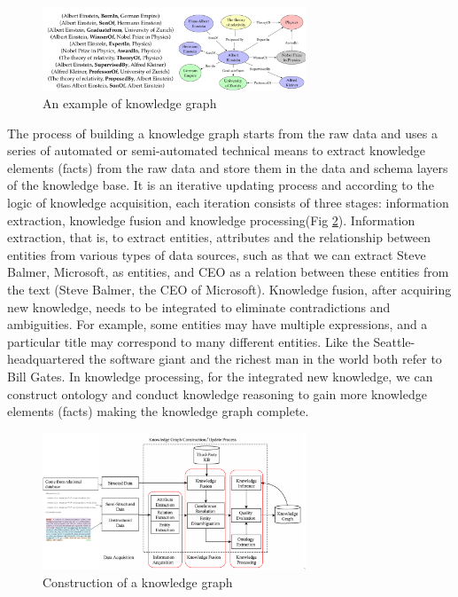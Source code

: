 \documentclass[%
 aip,
 jmp,%
 amsmath,amssymb,
 reprint,%
]{revtex4-2}
\begin{document}
\begin{figure}[htbp]
 \centering
 \includegraphics[width=0.7\textwidth]{figure/2.png}
 \caption{ An example of knowledge graph }
 \label{ Fig.2 }
\end{figure}

The process of building a knowledge graph starts from the raw data and uses a series of automated or 
semi-automated technical means to extract knowledge elements (facts) from the raw data and store them 
in the data and schema layers of the knowledge base\cite{gutierrez2021knowledge}. It is an iterative updating process and according 
to the logic of knowledge acquisition, each iteration consists of three stages: information extraction, 
knowledge fusion and knowledge processing(Fig \ref{ Fig.1 }). Information extraction, that is, to extract 
entities, attributes and the relationship between entities from various types of data sources, 
such as that we can extract Steve Balmer, Microsoft, as entities, and CEO as a relation between these entities from
the text (Steve Balmer, the CEO of Microsoft). Knowledge fusion, after acquiring new knowledge, needs to be 
integrated to eliminate contradictions and ambiguities. For example, some entities may have multiple 
expressions, and a particular title may correspond to many different entities. Like the Seattle-headquartered 
the software giant and the richest man in the world both refer to Bill Gates. In knowledge processing, for the integrated new knowledge, 
we can construct ontology and conduct knowledge reasoning to gain more knowledge elements (facts) making the knowledge graph complete. 

\begin{figure}[htbp]
 \centering
 \includegraphics[width=0.7\textwidth]{figure/1.png}
 \caption{ Construction of a knowledge graph }
 \label{ Fig.1 }
\end{figure}
\end{document}

